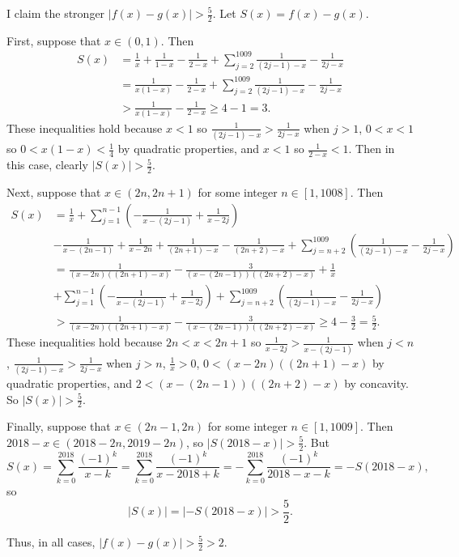 I claim the stronger $\left|f\left(x\right)-g\left(x\right)\right|>\frac{5}{2}$. Let $S\left(x\right)=f\left(x\right)-g\left(x\right)$.

First, suppose that $x\in\left(0,1\right)$. Then
\begin{align*}
	S\left(x\right)&=\frac{1}{x}+\frac{1}{1-x}-\frac{1}{2-x}+\displaystyle\sum_{j=2}^{1009}\frac{1}{\left(2j-1\right)-x}-\frac{1}{2j-x}\\
	&=\frac{1}{x\left(1-x\right)}-\frac{1}{2-x}+\displaystyle\sum_{j=2}^{1009}\frac{1}{\left(2j-1\right)-x}-\frac{1}{2j-x}\\
	&>\frac{1}{x\left(1-x\right)}-\frac{1}{2-x}\geq4-1=3.
\end{align*}
These inequalities hold because $x<1$ so $\frac{1}{\left(2j-1\right)-x}>\frac{1}{2j-x}$ when $j>1$, $0<x<1$ so $0<x\left(1-x\right)<\frac{1}{4}$ by quadratic properties, and $x<1$ so $\frac{1}{2-x}<1$. Then in this case, clearly $\left|S\left(x\right)\right|>\frac{5}{2}$.

Next, suppose that $x\in\left(2n,2n+1\right)$ for some integer $n\in\left[1,1008\right]$. Then
\begin{align*}
	S\left(x\right)&=\frac{1}{x}+\displaystyle\sum_{j=1}^{n-1}\left(-\frac{1}{x-\left(2j-1\right)}+\frac{1}{x-2j}\right)\\&-\frac{1}{x-\left(2n-1\right)}+\frac{1}{x-2n}+\frac{1}{\left(2n+1\right)-x}-\frac{1}{\left(2n+2\right)-x}+\displaystyle\sum_{j=n+2}^{1009}\left(\frac{1}{\left(2j-1\right)-x}-\frac{1}{2j-x}\right)\\
	&=\frac{1}{\left(x-2n\right)\left(\left(2n+1\right)-x\right)}-\frac{3}{\left(x-\left(2n-1\right)\right)\left(\left(2n+2\right)-x\right)}+\frac{1}{x}\\&+\displaystyle\sum_{j=1}^{n-1}\left(-\frac{1}{x-\left(2j-1\right)}+\frac{1}{x-2j}\right)+\displaystyle\sum_{j=n+2}^{1009}\left(\frac{1}{\left(2j-1\right)-x}-\frac{1}{2j-x}\right)\\
	&>\frac{1}{\left(x-2n\right)\left(\left(2n+1\right)-x\right)}-\frac{3}{\left(x-\left(2n-1\right)\right)\left(\left(2n+2\right)-x\right)}\geq4-\frac{3}{2}=\frac{5}{2}.
\end{align*}
These inequalities hold because $2n<x<2n+1$ so $\frac{1}{x-2j}>\frac{1}{x-\left(2j-1\right)}$ when $j<n$, $\frac{1}{\left(2j-1\right)-x}>\frac{1}{2j-x}$ when $j>n$, $\frac{1}{x}>0$, $0<\left(x-2n\right)\left(\left(2n+1\right)-x\right)$ by quadratic properties, and $2<\left(x-\left(2n-1\right)\right)\left(\left(2n+2\right)-x\right)$ by concavity. So $\left|S\left(x\right)\right|>\frac{5}{2}$.

Finally, suppose that $x\in\left(2n-1,2n\right)$ for some integer $n\in\left[1,1009\right]$. Then $2018-x\in\left(2018-2n,2019-2n\right)$, so $\left|S\left(2018-x\right)\right|>\frac{5}{2}$. But \[S\left(x\right)=\displaystyle\sum_{k=0}^{2018}\frac{\left(-1\right)^k}{x-k}=\displaystyle\sum_{k=0}^{2018}\frac{\left(-1\right)^k}{x-2018+k}=-\displaystyle\sum_{k=0}^{2018}\frac{\left(-1\right)^k}{2018-x-k}=-S\left(2018-x\right),\] so \[\left|S\left(x\right)\right|=\left|-S\left(2018-x\right)\right|>\frac{5}{2}.\]

Thus, in all cases, $\left|f\left(x\right)-g\left(x\right)\right|>\frac{5}{2}>2$.